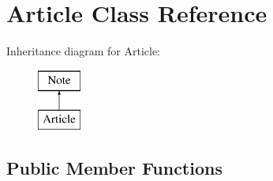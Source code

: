 \hypertarget{class_article}{}\section{Article Class Reference}
\label{class_article}
Inheritance diagram for Article\+:\begin{figure}[H]
\begin{center}
\leavevmode
\includegraphics[height=2.000000cm]{class_article}
\end{center}
\end{figure}
\subsection*{Public Member Functions}
